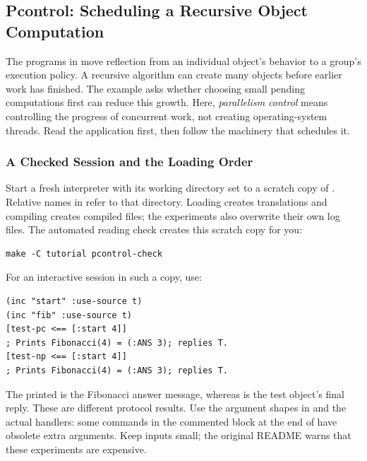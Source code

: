 \subsection{Pcontrol: Scheduling a Recursive Object Computation}
\label{sec:pcontrol}

The programs in  move reflection from an
individual object's behavior to a group's execution policy. A recursive
algorithm can create many objects before earlier work has finished.
The example asks whether choosing small pending computations first can
reduce this growth. Here, \emph{parallelism control} means controlling the
progress of concurrent work, not creating operating-system threads.
Read the application first, then follow the machinery that schedules it.

\subsubsection{A Checked Session and the Loading Order}
\label{sec:pcontrol-load}

Start a fresh interpreter with its working directory set to a scratch
copy of . Relative names in
 refer to that directory. Loading creates translations
and compiling creates compiled files; the experiments also overwrite
their own log files. The automated reading check creates this scratch
copy for you:

\begin{lstlisting}
make -C tutorial pcontrol-check
\end{lstlisting}

For an interactive session in such a copy, use:

\begin{codeblock}
\begin{lstlisting}
(inc "start" :use-source t)
(inc "fib" :use-source t)
[test-pc <== [:start 4]]
; Prints Fibonacci(4) = (:ANS 3); replies T.
[test-np <== [:start 4]]
; Prints Fibonacci(4) = (:ANS 3); replies T.
\end{lstlisting}
\end{codeblock}

The printed  is the Fibonacci answer message, whereas
 is the test object's final reply. These are different protocol
results. Use the argument shapes in  and the
actual handlers: some commands in the commented block at the end of
 have obsolete extra arguments.
Keep inputs small; the original README warns that these experiments
are expensive.

